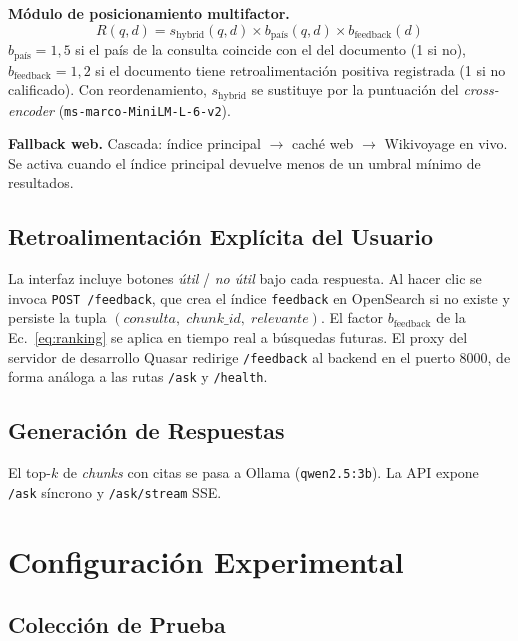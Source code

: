 \documentclass[runningheads]{llncs}
\begin{document}
\textbf{M\'odulo de posicionamiento multifactor.}
\begin{equation}
  R(q,d) = s_{\text{hybrid}}(q,d)
           \times b_{\text{pa\'is}}(q,d)
           \times b_{\text{feedback}}(d)
  \label{eq:ranking}
\end{equation}
$b_{\text{pa\'is}}=1{,}5$ si el pa\'is de la consulta coincide con el
del documento (1 si no), $b_{\text{feedback}}=1{,}2$ si el documento
tiene retroalimentaci\'on positiva registrada (1 si no calificado).
Con reordenamiento, $s_{\text{hybrid}}$ se sustituye por la puntuaci\'on
del \textit{cross-encoder}
(\texttt{ms-marco-MiniLM-L-6-v2}).

\textbf{Fallback web.} Cascada: \'indice principal $\to$ cach\'e web $\to$
Wikivoyage en vivo. Se activa cuando el \'indice principal devuelve
menos de un umbral m\'inimo de resultados.

\subsection{Retroalimentaci\'on Expl\'icita del Usuario}

La interfaz incluye botones \textit{\'util} / \textit{no \'util} bajo
cada respuesta. Al hacer clic se invoca \texttt{POST /feedback}, que
crea el \'indice \texttt{feedback} en OpenSearch si no existe y
persiste la tupla $(consulta,\allowbreak\;chunk\_id,\allowbreak\;relevante)$.
El factor $b_{\text{feedback}}$ de la Ec.~\ref{eq:ranking} se aplica
en tiempo real a b\'usquedas futuras. El proxy del servidor de
desarrollo Quasar redirige \texttt{/feedback} al backend en el puerto
8000, de forma an\'aloga a las rutas \texttt{/ask} y \texttt{/health}.

\subsection{Generaci\'on de Respuestas}

El top-$k$ de \textit{chunks} con citas se pasa a Ollama
(\texttt{qwen2.5:3b}). La API expone \texttt{/ask} s\'incrono y
\texttt{/ask/stream} SSE.

\section{Configuraci\'on Experimental}
\label{sec:evaluation}

\subsection{Colecci\'on de Prueba}
\end{document}
